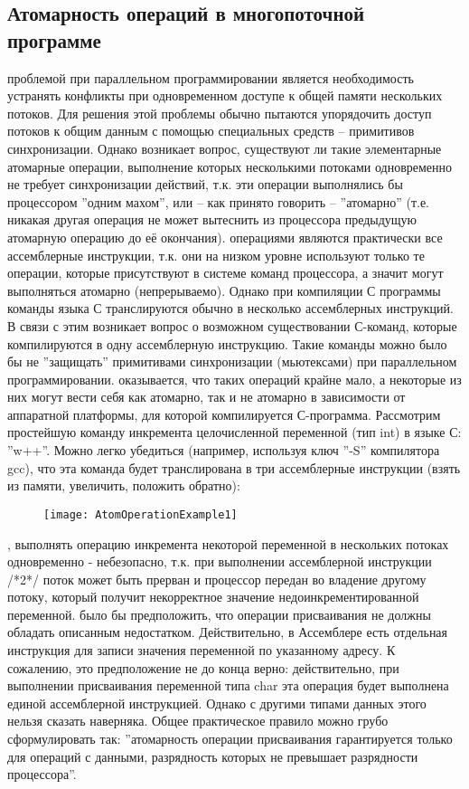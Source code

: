 { %
	\subsection{Атомарность операций в многопоточной программе}
	\label{atomic:section}
	 проблемой при параллельном программировании является необходимость устранять конфликты при одновременном доступе к общей памяти нескольких потоков. Для решения этой проблемы обычно пытаются упорядочить доступ потоков к общим данным с помощью специальных средств – примитивов синхронизации. Однако возникает вопрос, существуют ли такие элементарные атомарные операции, выполнение которых несколькими потоками одновременно не требует синхронизации действий, т.к. эти операции выполнялись бы процессором ''одним махом'', или – как принято говорить – ''атомарно'' (т.е. никакая другая операция не может вытеснить из процессора предыдущую атомарную операцию до её окончания).
	 операциями являются практически все ассемблерные инструкции, т.к. они на низком уровне используют только те операции, которые присутствуют в системе команд процессора, а значит могут выполняться атомарно (непрерываемо). Однако при компиляции С программы команды языка С транслируются обычно в несколько ассемблерных инструкций. В связи с этим возникает вопрос о возможном существовании С-команд, которые компилируются в одну ассемблерную инструкцию. Такие команды можно было бы не ''защищать'' примитивами синхронизации (мьютексами) при параллельном программировании.
	 оказывается, что таких операций крайне мало, а некоторые из них могут вести себя как атомарно, так и не атомарно в зависимости от аппаратной платформы, для которой компилируется С-программа. Рассмотрим простейшую команду инкремента целочисленной переменной (тип int) в языке С: ''w++''. Можно легко убедиться (например, используя ключ ''-S'' компилятора gcc), что эта команда будет транслирована в три ассемблерные инструкции (взять из памяти, увеличить, положить обратно):
	\begin{figure}[H]
		\texttt{[image: AtomOperationExample1]}
	\end{figure}
	, выполнять операцию инкремента некоторой переменной в нескольких потоках одновременно - небезопасно, т.к. при выполнении ассемблерной инструкции /*2*/ поток может быть прерван и процессор передан во владение другому потоку, который получит некорректное значение недоинкрементированной переменной.
	 было бы предположить, что операции присваивания не должны обладать описанным недостатком. Действительно, в Ассемблере есть отдельная инструкция для записи значения переменной по указанному адресу. К сожалению, это предположение не до конца верно: действительно, при выполнении присваивания переменной типа char эта операция будет выполнена единой ассемблерной инструкцией. Однако с другими типами данных этого нельзя сказать наверняка. Общее практическое правило можно грубо сформулировать так: ''атомарность операции присваивания гарантируется только для операций с данными, разрядность которых не превышает разрядности процессора''. 
}
